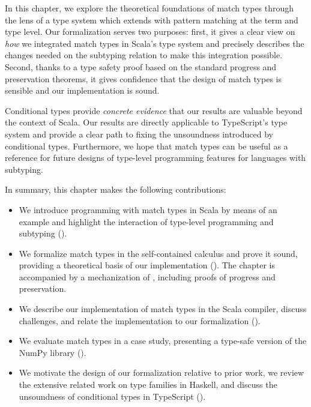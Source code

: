 In this chapter, we explore the theoretical foundations of match types through the lens of a type system which extends \SystemFsub with pattern matching at the term and type level.
%
Our formalization serves two purposes: first, it gives a clear view on \emph{how} we integrated match types in Scala's type system and precisely describes the changes needed on the subtyping relation to make this integration possible. Second, thanks to a type safety proof based on the standard progress and preservation theorems, it gives confidence that the design of match types is sensible and our implementation is sound.

Conditional types provide \emph{concrete evidence} that our results are valuable beyond the context of Scala.
Our results are directly applicable to TypeScript's type system and provide a clear path to fixing the unsoundness introduced by conditional types.
Furthermore, we hope that match types can be useful as a reference for future designs of type-level programming features for languages with subtyping.

In summary, this chapter makes the following contributions:
%
\begin{itemize}
  \item We introduce programming with match types in Scala by means of an example and highlight the interaction of type-level programming and subtyping ().

  \item We formalize match types in the self-contained calculus \SystemFm and prove it sound, providing a theoretical basis of our implementation (). The chapter is accompanied by a mechanization of \SystemFm, including proofs of progress and preservation.

  \item We describe our implementation of match types in the Scala compiler, discuss challenges, and relate the implementation to our formalization ().

  \item We evaluate match types in a case study, presenting a type-safe version of the NumPy library ().

  \item We motivate the design of our formalization relative to prior work, we review the extensive related work on type families in Haskell, and discuss the unsoundness of conditional types in TypeScript ().
\end{itemize}

